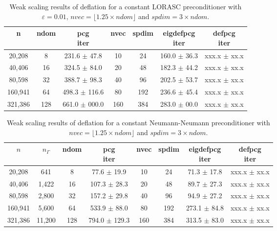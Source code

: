 \documentclass{article}
\begin{document}
\begin{table}[ht]
	\caption{Weak scaling results of deflation for a constant LORASC preconditioner with $\varepsilon=0.01$, $nvec=\lfloor1.25\times ndom\rfloor$ and $spdim=3\times ndom$.}
	\centering
	\begin{tabular}{|c|c|c|c|c|c|c|}
	\hline
	n & ndom & \makecell{pcg\\ iter} & nvec & spdim & \makecell{eigdefpcg\\ iter} & \makecell{defpcg\\ iter}\\
	\hline
	20,208  &   8 & 231.6 $\pm$  47.8 &  10 &  24 & 160.0 $\pm$ 36.3 & xxx.x $\pm$ xx.x \\
	40,406  &  16 & 324.5 $\pm$  84.0 &  20 &  48 & 182.3 $\pm$ 44.2 & xxx.x $\pm$ xx.x \\
	80,598  &  32 & 388.7 $\pm$  98.3 &  40 &  96 & 202.5 $\pm$ 53.7 & xxx.x $\pm$ xx.x \\
	160,941 &  64 & 498.3 $\pm$ 116.6 &  80 & 192 & 236.6 $\pm$ 45.4 & xxx.x $\pm$ xx.x \\
	321,386 & 128 & 661.0 $\pm$ 000.0 & 160 & 384 & 283.0 $\pm$ 00.0 & xxx.x $\pm$ xx.x \\
	\hline
\end{tabular}
	\label{Tab:015}
\end{table}



\begin{table}[ht]
	\caption{Weak scaling results of deflation for a constant Neumann-Neumann preconditioner with $nvec=\lfloor1.25\times ndom\rfloor$ and $spdim=3\times ndom$.}
	\centering
	\begin{tabular}{|c|c|c|c|c|c|c|c|}
	\hline
	$n$ & $n_\Gamma$ & ndom & \makecell{pcg\\ iter} & nvec & spdim & \makecell{eigdefpcg\\ iter} & \makecell{defpcg\\ iter}\\
	\hline
	20,208  & 641    &   8 &  77.6 $\pm$  19.9 &  10 &  24  & 71.3 $\pm$ 17.8 & xxx.x $\pm$ xx.x \\
	40,406  & 1,422  &  16 & 107.3 $\pm$  28.3 &  20 &  48  & 89.7 $\pm$ 27.3 & xxx.x $\pm$ xx.x \\
	80,598  & 2,800  &  32 & 157.2 $\pm$  29.8 &  40 &  96 &  94.9 $\pm$ 27.2 & xxx.x $\pm$ xx.x \\
	160,941 & 5,600  &  64 & 533.9 $\pm$  88.0 &  80 & 192 & 273.1 $\pm$ 84.8 & xxx.x $\pm$ xx.x \\
	321,386 & 11,200 & 128 & 794.0 $\pm$ 129.3 & 160 & 384 & 313.5 $\pm$ 83.0 & xxx.x $\pm$ xx.x \\
	\hline
    \end{tabular}
	\label{Tab:025}
\end{table}
\end{document}

